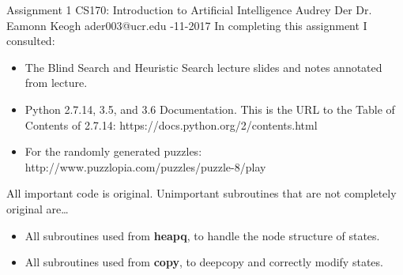 \documentclass{article}
\begin{document}
\begin{titlepage}
	\noindent Assignment 1 \hfill CS170: Introduction to Artificial Intelligence \newline \newline
	Audrey Der \hfill Dr. Eamonn Keogh  \newline
	ader003@ucr.edu -11-2017 \newline \newline \newline
	In completing this assignment I consulted:
	\begin{itemize}
		\item The Blind Search and Heuristic Search lecture slides and notes annotated from lecture.
        \item Python 2.7.14, 3.5, and 3.6 Documentation. This is the URL to the
          Table of Contents of 2.7.14:  https://docs.python.org/2/contents.html
          \item For the randomly generated puzzles: http://www.puzzlopia.com/puzzles/puzzle-8/play
	\end{itemize}
	All important code is original. Unimportant subroutines that are not completely original are\ldots
	\begin{itemize}
  \item All subroutines used from \textbf{heapq}, to handle the node structure of states.
  \item All subroutines used from \textbf{copy}, to deepcopy and correctly modify states.
	\end{itemize}
\end{titlepage}
\end{document}
